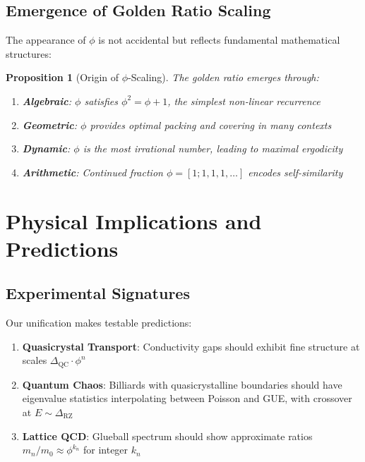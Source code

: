 \documentclass[12pt]{article}
\newtheorem{proposition}[theorem]{Proposition}
\newcommand{\QC}{\text{QC}}
\newcommand{\RZ}{\text{RZ}}
\begin{document}
\subsection{Emergence of Golden Ratio Scaling}

The appearance of $\phi$ is not accidental but reflects fundamental mathematical structures:

\begin{proposition}[Origin of $\phi$-Scaling]
The golden ratio emerges through:
\begin{enumerate}
\item \textbf{Algebraic}: $\phi$ satisfies $\phi^2 = \phi + 1$, the simplest non-linear recurrence
\item \textbf{Geometric}: $\phi$ provides optimal packing and covering in many contexts
\item \textbf{Dynamic}: $\phi$ is the most irrational number, leading to maximal ergodicity
\item \textbf{Arithmetic}: Continued fraction $\phi = [1;1,1,1,\ldots]$ encodes self-similarity
\end{enumerate}
\end{proposition}

\section{Physical Implications and Predictions}

\subsection{Experimental Signatures}

Our unification makes testable predictions:

\begin{enumerate}
\item \textbf{Quasicrystal Transport}: Conductivity gaps should exhibit fine structure at scales $\Delta_{\QC} \cdot \phi^n$

\item \textbf{Quantum Chaos}: Billiards with quasicrystalline boundaries should have eigenvalue statistics interpolating between Poisson and GUE, with crossover at $E \sim \Delta_{\RZ}$

\item \textbf{Lattice QCD}: Glueball spectrum should show approximate ratios $m_n/m_0 \approx \phi^{k_n}$ for integer $k_n$
\end{enumerate}
\end{document}

